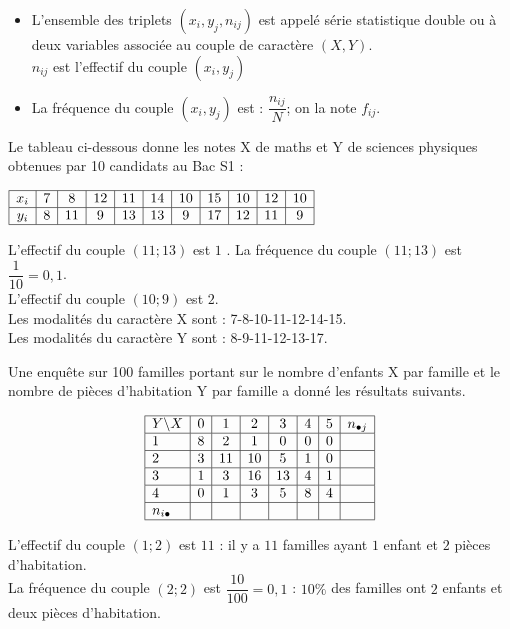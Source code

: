 \begin{definition}

\begin{itemize}
\item L’ensemble des triplets $(x_i,y_j, n_{ij})$ est appelé série statistique double ou à deux variables associée au couple de caractère $(X,Y)$.\\
$n_{ij}$ est l’effectif du couple $(x_i,y_j)$
\item La fréquence du couple $(x_i , y_j)$ est : $ \dfrac{n_{ij}}{N} $;\; on la note $ f_{ij} $.\qquad  {}
\end{itemize}


\end{definition}


\begin{example} 
Le tableau ci-dessous donne les notes X de maths et Y de sciences physiques obtenues par 10 candidats au Bac S1 :

\medskip


   $\begin{array}{|c|c|c|c|c|c|c|c|c|c|c|}
\hline
  x_i & 7& 8 & 12&  11 &  14  &10 & 15 & 10  &12 & 10\\
 \hline
  y_i  & 8 & 11 & 9 & 13& 13 &9 &17 &12 &11&9 \\
 \hline
\end{array}$

L’effectif du couple $(11 ;13)$ est $1$ . La fréquence du couple $(11 ;13)$ est $\dfrac{1}{10} =0,1$.\\
L’effectif du couple $(10;9)$ est $2$.\\
Les modalités du caractère X sont :
 7-8-10-11-12-14-15.\\
Les modalités du caractère Y sont :
8-9-11-12-13-17.

\end{example}
\medskip

\begin{example}
Une enquête sur 100 familles portant sur le nombre d’enfants X par famille et le nombre de pièces d’habitation Y par famille a donné les résultats suivants.


\[

\begin{array}{|l|c|c|c|c|c|c|c|}
\hline
Y \backslash X & 0 & 1 & 2 & 3 & 4 & 5 & n_{\bullet j} \\
\hline
1 & 8 & 2 & 1 & 0 & 0 & 0 &  \\
\hline
2 & 3 & 11 & 10 & 5 & 1 & 0 &  \\
\hline
3 & 1 & 3 & 16 & 13 & 4 & 1 &  \\
\hline
4 & 0 & 1 & 3 & 5 & 8 & 4 &  \\
\hline
n_{i \bullet} &  &  &  &  &  &  &  \\
\hline
\end{array}
\]


L’effectif du couple $(1 ;2)$ est $11$ : il y a $11$ familles ayant $1$ enfant et $2$ pièces d’habitation.\\
La fréquence du couple $(2 ;2)$  est $ \dfrac{10}{100}=0,1$ : $10\%$ des familles ont $2$ enfants et deux pièces d’habitation.

\end{example}

